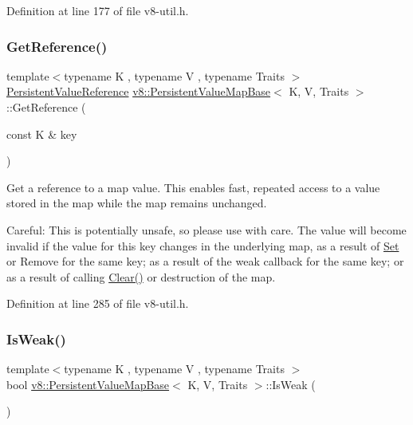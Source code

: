 Definition at line 177 of file v8-\/util.\+h.

\mbox{\label{classv8_1_1PersistentValueMapBase_a52e74c69b94c7ce77a65af9f32d68af4}} 
\subsubsection{\texorpdfstring{Get\+Reference()}{GetReference()}}
{\footnotesize\ttfamily template$<$typename K , typename V , typename Traits $>$ \\
\mbox{\hyperlink{classv8_1_1PersistentValueMapBase_1_1PersistentValueReference}{Persistent\+Value\+Reference}} \mbox{\hyperlink{classv8_1_1PersistentValueMapBase}{v8\+::\+Persistent\+Value\+Map\+Base}}$<$ K, V, Traits $>$\+::Get\+Reference (\begin{DoxyParamCaption}\item[{const K \&}]{key }\end{DoxyParamCaption})\hspace{0.3cm}{\ttfamily [inline]}}

Get a reference to a map value. This enables fast, repeated access to a value stored in the map while the map remains unchanged.

Careful\+: This is potentially unsafe, so please use with care. The value will become invalid if the value for this key changes in the underlying map, as a result of \mbox{\hyperlink{classv8_1_1Set}{Set}} or Remove for the same key; as a result of the weak callback for the same key; or as a result of calling \mbox{\hyperlink{classv8_1_1PersistentValueMapBase_a1bf074e7a7c24713c9a3d40ddce89e74}{Clear()}} or destruction of the map. 

Definition at line 285 of file v8-\/util.\+h.

\mbox{\label{classv8_1_1PersistentValueMapBase_a9f824b13dd30605589508db2740dd678}} 
\subsubsection{\texorpdfstring{Is\+Weak()}{IsWeak()}}
{\footnotesize\ttfamily template$<$typename K , typename V , typename Traits $>$ \\
bool \mbox{\hyperlink{classv8_1_1PersistentValueMapBase}{v8\+::\+Persistent\+Value\+Map\+Base}}$<$ K, V, Traits $>$\+::Is\+Weak (\begin{DoxyParamCaption}{ }\end{DoxyParamCaption})\hspace{0.3cm}{\ttfamily [inline]}}

